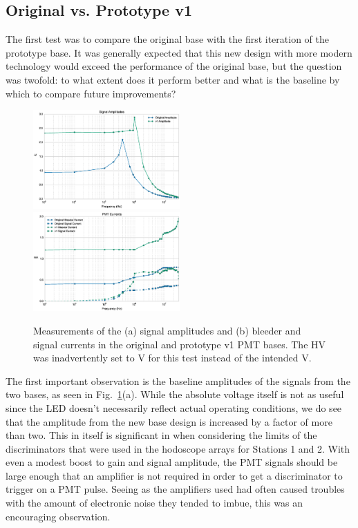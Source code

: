 \subsection{Original vs. Prototype v1}

The first test was to compare the original base with the first iteration of the prototype base. It was generally expected that this new design with more modern technology would exceed the performance of the original base, but the question was twofold: to what extent does it perform better and what is the baseline by which to compare future improvements? 

\begin{figure}[ht]
	\centerline{
		\mbox{\includegraphics[width=0.5\textwidth]{figures/pmtupgrade/Test_v1_Amp.eps} \includegraphics[width=0.5\textwidth]{figures/pmtupgrade/Test_v1_Current.eps}}}
	\caption{Measurements of the (a) signal amplitudes and (b) bleeder and signal currents in the original and prototype v1 PMT bases. The HV was inadvertently set to \unit[-1600V]{V} for this test instead of the intended \unit[-1500]{V}.}
	\label{fig:test-v1}
\end{figure}

The first important observation is the baseline amplitudes of the signals from the two bases, as seen in Fig.~\ref{fig:test-v1}(a). While the absolute voltage itself is not as useful since the LED doesn't necessarily reflect actual operating conditions, we do see that the amplitude from the new base design is increased by a factor of more than two. This in itself is significant in when considering the limits of the discriminators that were used in the hodoscope arrays for Stations 1 and 2. With even a modest boost to gain and signal amplitude, the PMT signals should be large enough that an amplifier is not required in order to get a discriminator to trigger on a PMT pulse. Seeing as the amplifiers used had often caused troubles with the amount of electronic noise they tended to imbue, this was an encouraging observation.

